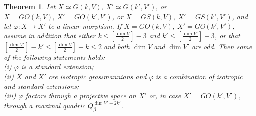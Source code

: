 \documentclass[12pt]{amsart}
\renewcommand{\phi}{\varphi}
\theoremstyle{definition}
\begin{document}
{\bf Theorem 1}.
\textit{Let $X\simeq G(k,V)$, $X'\simeq G(k',V')$, or $X=GO(k,V),\ X'=GO(k',V')$, or
$X=GS(k,V),\ X'=GS(k',V')$, and let $\phi: X \to X'$ be a linear morphism. If $X=GO(k,V),\ X'=GO(k',V')$, assume
in addition that either $k\le[\frac{\dim V}{2}]-3$ and $k'\le[\frac{\dim V'}{2}]-3$, or that
$[\frac{\dim V'}{2}]-k'\le[\frac{\dim V}{2}]-k\le2$ and both $\dim V$ and $\dim V'$ are odd.
Then some of the following statements holds:\\
(i) $\phi$ is a standard extension;\\
(ii) $X$ and $X'$ are isotropic grassmannians and $\phi$ is a combination of isotropic and standard
extensions;\\
(iii) $\phi$ factors through a projective space on $X'$ or, in case $X'=GO(k',V')$, through a maximal quadric
$Q_{\beta}^{\dim V'-2k'}$.}
\end{document}
